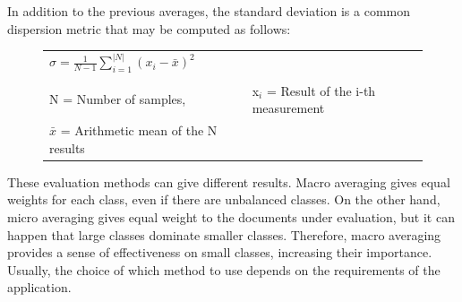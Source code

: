 In addition to the previous averages, the standard deviation is a common dispersion metric that may be computed as follows:
    \begin{figure}[H]
      \centering
\begin{tabular}{ll}
		\Large
		\( \sigma = \frac{1}{N-1}\sum_{i=1}^{|N|}{(x_i - \bar{x})^2} \) & \\
		\\
        N = Number of samples, & x$_i$ = Result of the i-th measurement \\
		$\bar{x}$ = Arithmetic mean of the N results
      \end{tabular}
\end{figure}

These evaluation methods can give different results. Macro averaging gives equal weights for each class, even if there are unbalanced classes. On the other hand, micro averaging gives equal weight to the documents under evaluation, but it can happen that large classes dominate smaller classes. Therefore, macro averaging provides a sense of effectiveness on small classes, increasing their importance. Usually, the choice of which method to use depends on the requirements of the application.

